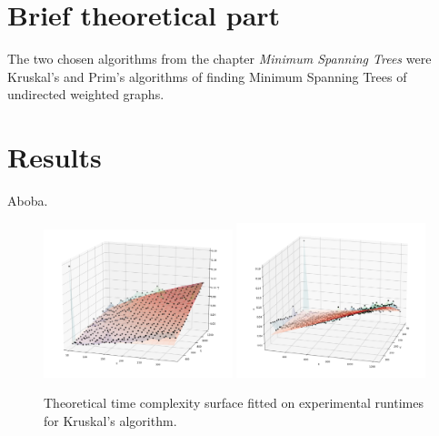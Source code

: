 \documentclass[12pt, a4paper]{article}
\begin{document}
\section*{Brief theoretical part}

The two chosen algorithms from the chapter \textit{Minimum Spanning Trees} were Kruskal's and Prim's algorithms of finding Minimum Spanning Trees of undirected weighted graphs.

\newpage

\section*{Results}

Aboba.

\begin{figure}[!h]
\centering
\includegraphics[width=0.49\textwidth]{kruskal_1.png}
\includegraphics[width=0.49\textwidth]{kruskal_2.png}
\caption{Theoretical time complexity surface fitted on experimental runtimes for Kruskal's algorithm.}
\end{figure}
\end{document}
